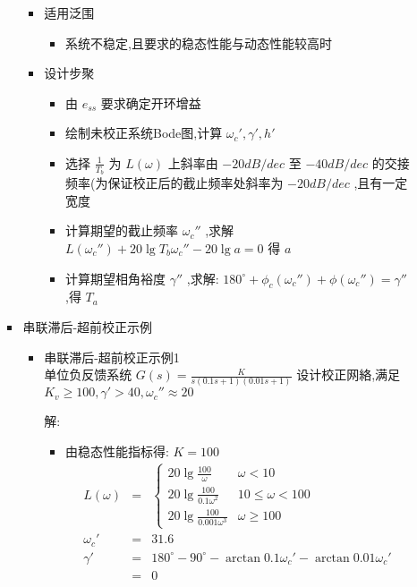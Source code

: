 \documentclass[table]{article}
\begin{document}
\begin{frame}
\begin{itemize}
\begin{itemize}
\begin{itemize}
\begin{itemize}
\item 适用泛围
\label{sec-2-2-10-2-5-1-2}%
\begin{itemize}
\item 系统不稳定,且要求的稳态性能与动态性能较高时
\end{itemize}

\item 设计步聚
\label{sec-2-2-10-2-5-1-3}%
\begin{itemize}
\item 由 $e_{ss}$ 要求确定开环增益
\item 绘制未校正系统Bode图,计算 $\omega_c',\gamma',h'$
\item <2->选择  $\frac{1}{T_b}$  为  $L(\omega)$  上斜率由  $-20dB/dec$  至 $-40dB/dec$ 的交接频率(为保证校正后的截止频率处斜率为 $-20dB/dec$ ,且有一定宽度
\item <3->计算期望的截止频率 $\omega_c''$ ,求解  $L(\omega_c'')+20\lg T_b\omega_c''-20\lg a=0$  得 $a$
\item <4->计算期望相角裕度 $\gamma''$ ,求解:  $180^\circ+\phi_c(\omega_c'')+\phi(\omega_c'')=\gamma''$  ,得 $T_a$
\end{itemize}
\end{itemize} %

\item 串联滞后-超前校正示例
\label{sec-2-2-10-2-5-2}%
\begin{itemize}

\item 串联滞后-超前校正示例1\\
\label{sec-2-2-10-2-5-2-1}%
单位负反馈系统  $G(s)=\frac{K}{s(0.1s+1)(0.01s+1)}$  设计校正网絡,满足  $K_v \geq 100,\gamma'>40,\omega_c''\approx 20$ 

解:
\begin{itemize}
\item <2->由稳态性能指标得:  $K=100$ 
      \begin{eqnarray*}
      L(\omega) & = &\begin{cases}20\lg\frac{100}{\omega} & \omega<10 \\
                                  20\lg\frac{100}{0.1\omega^2} & 10\leq \omega<100 \\
                                  20\lg\frac{100}{0.001\omega^3} & \omega \geq 100 \end{cases} \\
      \omega_c' &=& 31.6 \\
      \gamma' &=& 180^{\circ}-90^{\circ}-\arctan0.1\omega_c'-\arctan0.01\omega_c' \\
       &=& 0 
      \end{eqnarray*}
\end{itemize}



\end{itemize}
\end{itemize}
\end{itemize}
\end{itemize}
\end{frame}
\end{document}

